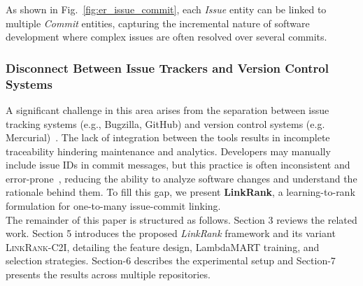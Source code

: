 As shown in Fig.~\ref{fig:er_issue_commit}, each \textit{Issue} entity can be linked to multiple \textit{Commit} entities, capturing the incremental nature of software development where complex issues are often resolved over several commits.


\subsubsection*{Disconnect Between Issue Trackers and Version Control Systems}

A significant challenge in this area arises from the separation between issue tracking systems (e.g., Bugzilla, GitHub) and version control systems (e.g. Mercurial)~\cite{r1,r2}. The lack of integration between the tools results in incomplete traceability hindering maintenance and analytics. Developers may manually include issue IDs in commit messages, but this practice is often inconsistent and error-prone~\cite{r16,r18}, reducing the ability to analyze software changes and understand the rationale behind them. To fill this gap, we present \textbf{LinkRank}, a learning-to-rank formulation for one-to-many issue-commit linking.\\

\noindent
The remainder of this paper is structured as follows. Section 3 reviews the related work. Section 5 introduces the proposed \emph{LinkRank} framework and its variant \textsc{LinkRank-C2I}, detailing the feature design, LambdaMART training, and selection strategies. Section-6 describes the experimental setup and Section-7 presents the results across multiple repositories.

% 
% 
